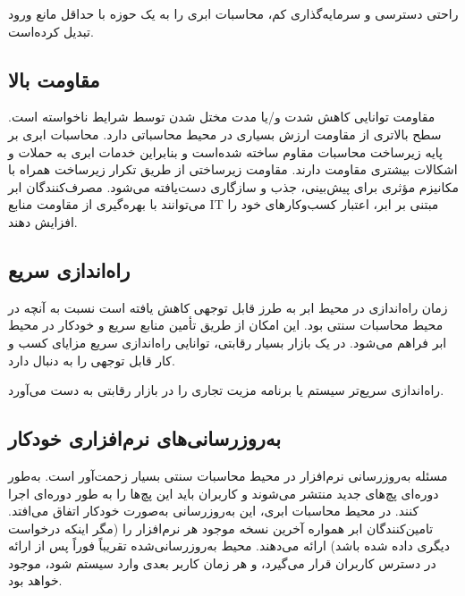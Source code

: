 \documentclass{book}
\begin{document}
    \begin{addinfo}

        راحتی دسترسی و سرمایه‌گذاری کم، محاسبات ابری را به یک حوزه با حداقل مانع ورود تبدیل کرده‌است.

    \end{addinfo}

    \subsection{مقاومت بالا}

        مقاومت توانایی کاهش شدت و/یا مدت مختل شدن توسط شرایط ناخواسته است. سطح بالاتری از مقاومت ارزش بسیاری در محیط محاسباتی دارد. محاسبات ابری بر پایه زیرساخت محاسبات مقاوم ساخته شده‌است و بنابراین خدمات ابری به حملات و اشکالات بیشتری مقاومت دارند. مقاومت زیرساختی از طریق تکرار زیرساخت همراه با مکانیزم مؤثری برای پیش‌بینی، جذب و سازگاری دست‌یافته می‌شود. مصرف‌کنندگان ابر می‌توانند با بهره‌گیری از مقاومت منابع IT مبتنی بر ابر، اعتبار کسب‌وکارهای خود را افزایش دهند.

    \subsection{راه‌اندازی سریع}

        زمان راه‌اندازی در محیط ابر به طرز قابل توجهی کاهش یافته است نسبت به آنچه در محیط محاسبات سنتی بود. این امکان از طریق تأمین منابع سریع و خودکار در محیط ابر فراهم می‌شود. در یک بازار بسیار رقابتی، توانایی راه‌اندازی سریع مزایای کسب و کار قابل توجهی را به دنبال دارد.

    \begin{addinfo}

        راه‌اندازی سریع‌تر سیستم یا برنامه مزیت تجاری را در بازار رقابتی به دست می‌آورد.

    \end{addinfo}

    \subsection{به‌روزرسانی‌های نرم‌افزاری خودکار}

        مسئله به‌روزرسانی نرم‌افزار در محیط محاسبات سنتی بسیار زحمت‌آور است. به‌طور دوره‌ای پچ‌های جدید منتشر می‌شوند و کاربران باید این پچ‌ها را به طور دوره‌ای اجرا کنند. در محیط محاسبات ابری، این به‌روزرسانی به‌صورت خودکار اتفاق می‌افتد. تامین‌کنندگان ابر همواره آخرین نسخه موجود هر نرم‌افزار را (مگر اینکه درخواست دیگری داده شده باشد) ارائه می‌دهند. محیط به‌روزرسانی‌شده تقریباً فوراً پس از ارائه در دسترس کاربران قرار می‌گیرد، و هر زمان کاربر بعدی وارد سیستم شود، موجود خواهد بود.
\end{document}
